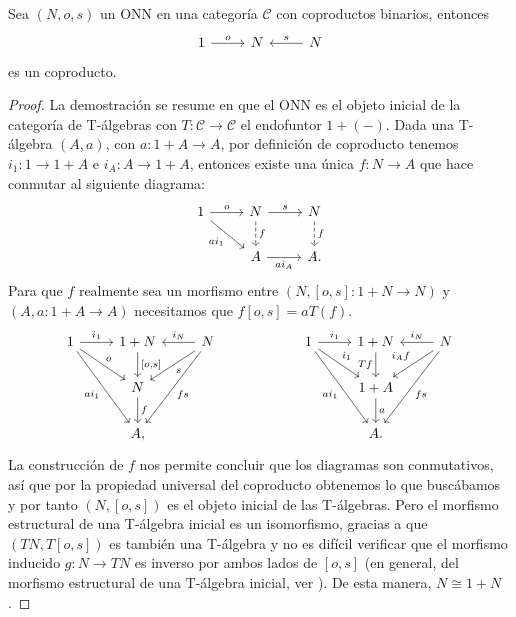 \begin{proposition}[label=prop:onncoproducto]
  Sea $(N,o,s)$ un ONN en una categoría $\mathcal{C}$ con coproductos binarios, entonces
  \begin{equation*}
    \begin{tikzcd}
      1\ar{r}{o} & N & N\ar[swap]{l}{s}
    \end{tikzcd}
  \end{equation*}
  es un coproducto.
\end{proposition}
\begin{proof}
  La demostración se resume en que el ONN es el objeto inicial de la categoría de T-álgebras con
  $T\colon \mathcal{C}\to \mathcal{C}$ el endofuntor $1+(-)$. Dada una T-álgebra $(A,a)$, con $a\colon 1+A\to A$,
  por definición de coproducto tenemos $i_1\colon 1\to 1+A$ e $i_A\colon A\to
  1+A$, entonces existe una única $f\colon N\to A$ que hace conmutar al siguiente diagrama:
  \begin{equation*}
    \begin{tikzcd}
      1\ar{r}{o}\ar[swap]{rd}{ai_1} & N\ar[dashed]{d}{f}\ar{r}{s} & N\ar[dashed]{d}{f} \\
      & A\ar[swap]{r}{ai_A} & A.
    \end{tikzcd}
  \end{equation*}
  Para que $f$ realmente sea un morfismo entre $(N,[o,s]\colon 1+N\to N)$ y $(A,a\colon 1+A\to A)$ necesitamos que $f[o,s]=aT(f)$.
  \begin{equation*}
    \begin{tikzcd}
      1\ar{r}{i_1}\ar[swap]{rdd}{ai_1}\ar{rd}{o} & 1+N\ar{d}{[o,s]} & N\ar[swap]{l}{i_N}\ar{ldd}{fs}\ar{ld}{s} & {} & 1\ar{r}{i_1}\ar[swap]{rdd}{ai_1}\ar{rd}{i_1} & 1+N\ar[swap]{d}{Tf} & N\ar[swap]{l}{i_N}\ar{ldd}{fs}\ar[swap]{ld}{i_Af} \\
        & N\ar{d}{f} & {} & {} & {} & 1+A\ar{d}{a} & {} \\
        & A, & {} & {} & {} & A. & {}
    \end{tikzcd}
  \end{equation*}
  La construcción de $f$ nos permite concluir que los diagramas son conmutativos, así que
  por la propiedad universal del coproducto obtenemos lo que buscábamos y por tanto $(N,[o,s])$ es el
  objeto inicial de las T-álgebras. Pero el morfismo estructural de una T-álgebra inicial es un isomorfismo,
  gracias a que $(TN, T[o,s])$ es también una T-álgebra y no es difícil verificar que el morfismo inducido $g\colon N\to TN$ es
  inverso por ambos lados de $[o,s]$ (en general, del morfismo estructural de
  una T-álgebra inicial, ver \cite{johnstone2002sketches}).
  De esta manera, $N\cong 1+N$.
\end{proof}

